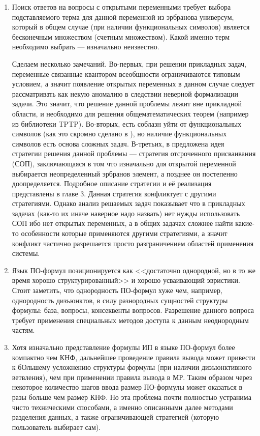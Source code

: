 \begin{enumerate}

\item Поиск ответов на вопросы с открытыми переменными требует выбора подставляемого терма для данной переменной из эрбранова универсум, который в общем случае (при наличии функциональных символов) является бесконечным множеством (счетным множеством). Какой именно терм необходимо выбрать --- изначально неизвестно.

Сделаем несколько замечаний. Во-первых, при решении прикладных задач, переменные связанные квантором всеобщности ограничиваются типовым условием, а значит появление открытых переменных в данном случае следует рассматривать как некую аномалию в следствии неверной формализации задачи. Это значит, что решение данной проблемы лежит вне прикладной области, и необходимо для решения общематематических теорем (например из библиотеки TPTP).  Во-вторых, есть соблазн уйти от функциональных символов (как это скромно сделано в \cite{Vas_ICDS}), но наличие функциональных символов есть основа сложных задач. В-третьих, в \cite{Vas_ICDS} предложена идея стратегии решения данной проблемы --- стратегия отсроченного присваивания (СОП), заключающаяся в том что изначально для открытой переменной выбирается неопределенный эрбранов элемент, а позднее он постепенно доопределяется. Подробное описание стратегии и её реализация представлены в главе 3. Данная стратегия конфликтует с другими стратегиями. Однако анализ решаемых задач показывает что в прикладных задачах (как-то их иначе наверное надо назвать) нет нужды использовать СОП ибо нет открытых переменных, а в общих задачах сложнее найти какие-то особенности которые применяются другими стратегиями, а значит конфликт частично разрешается просто разграничением областей применения системы.

\item Язык ПО-формул позиционируется как <<достаточно однородной, но в то же время хорошо структурированный>> и хорошо усваивающий эвристики. Стоит заметить, что однородность ПО-формул хуже чем, например, однородность дизъюнктов, в силу разнородных сущностей структуры формулы: база, вопросы, консеквенты вопросов. Разрешение данного вопроса требует применения специальных методов доступа к данным неоднородным частям.

\item Хотя изначально представление формулы ИП в языке ПО-формул более компактно чем КНФ, дальнейшее проведение правила вывода может привести к бОльшему усложнению структуры формулы (при наличии дизъюнктивного ветвления), чем при применении правила вывода в МР. Таким образом через некоторое количество шагов ввода размер ПО-формулы может оказаться в разы больше чем размер КНФ. Но эта проблема почти полностью устранима чисто техническими способами, а именно описанными далее методами разделения данных, а также ограничивающей стратегией (которую пользователь выбирает сам).

\end{enumerate}


